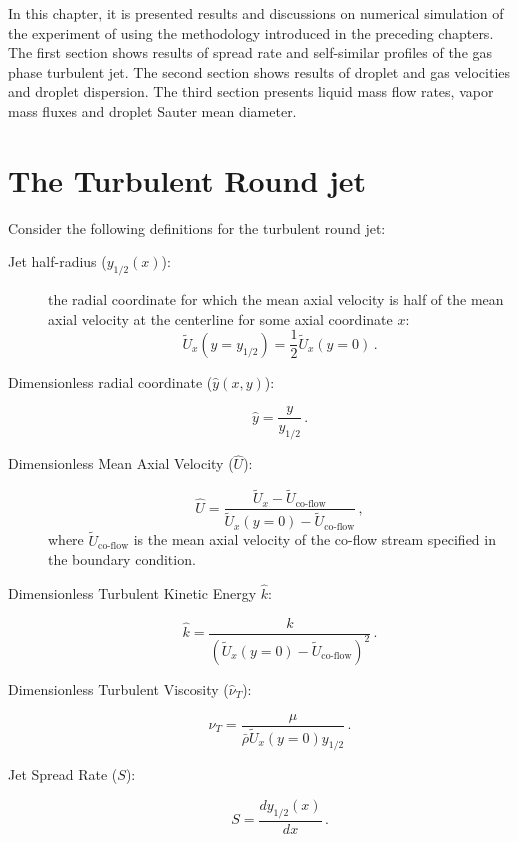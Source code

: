 
In this chapter, it is presented results and discussions on numerical simulation of the experiment of \cite{chen} using the methodology introduced in the preceding chapters. The first section shows results of spread rate and self-similar profiles of the gas phase turbulent jet. The second section shows results of droplet and gas velocities and droplet dispersion. The third section presents liquid mass flow rates, vapor mass fluxes and droplet Sauter mean diameter.

\section{The Turbulent Round jet}

Consider the following definitions for the turbulent round jet:
\begin{description}
 \item[Jet half-radius ($y_{1/2}(x)$):] the radial coordinate for which the mean axial velocity is half of the mean axial velocity at the centerline for some axial coordinate $x$:
\begin{equation}
\tilde{U}_x (y=y_{1/2}) = \frac{1}{2}\tilde{U}_x(y=0) \, .
\end{equation}
\item[Dimensionless radial coordinate ($\hat{y}(x,y)$):]
\begin{equation}
 \hat{y} = \frac{y}{y_{1/2}} \, .
\end{equation}

\item[Dimensionless Mean Axial Velocity ($\hat{U}$):]
\begin{equation}
 \hat{U} = \frac{\tilde{U}_x-\tilde{U}_{\text{co-flow}}}{\tilde{U}_x (y=0)-\tilde{U}_{\text{co-flow}}} \, ,
\end{equation}
where $\tilde{U}_{\text{co-flow}}$ is the mean axial velocity of the co-flow stream specified in the boundary condition.

\item[Dimensionless Turbulent Kinetic Energy $\hat{k}$:]
\begin{equation}
 \hat{k}=\frac{k}{(\tilde{U}_x (y=0)-\tilde{U}_{\text{co-flow}})^2} \, .
\end{equation}

\item[Dimensionless Turbulent Viscosity ($\hat{\nu}_T$):]
\begin{equation}
\hat{\nu}_T = \frac{\mu}{\bar{\rho}\tilde{U}_x(y=0) y_{1/2}} \, .
\end{equation}

\item[Jet Spread Rate ($S$):]
\begin{equation}
S = \frac{d y_{1/2} (x)}{dx} \, .
\end{equation}
\end{description}

